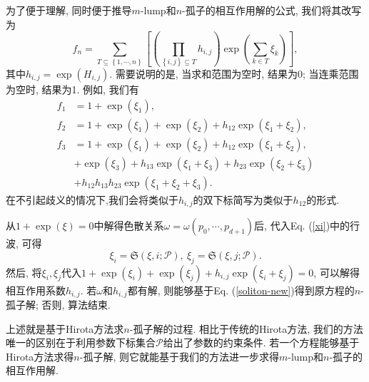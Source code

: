 \documentclass[12pt,a4paper,UTF8]{article}
\numberwithin{equation}{section}
\newcommand{\sbrace}[1]{\left(#1\right)}
\newcommand{\mbrace}[1]{\left[#1\right]}
\newcommand{\bbrace}[1]{\left\{#1\right\}}
\newcommand{\PS}{\mathcal{P}}
\newcommand{\SP}{\mathfrak{S}} %
\newcommand{\refeqn}[1]{Eq. (\ref{#1})}
\newcommand{\MLNS}{$m$-lump和$n$-孤子的相互作用解}
\begin{document}
为了便于理解, 同时便于推导\MLNS{}的公式, 我们将其改写为
\begin{equation}
f_n=\sum_{T\subseteq \bbrace{1,\cdots,n}}\mbrace{\sbrace{\prod_{\bbrace{i,j}\subseteq T}{h_{i,j}}}\exp\sbrace{\sum_{k\in T}{\xi_k}}}, 
\label{soliton-new}
\end{equation}
其中$h_{i,j}=\exp(H_{i,j})$. 需要说明的是, 当求和范围为空时, 结果为0; 当连乘范围为空时, 结果为1. 例如, 我们有
\begin{equation}
\begin{aligned}
f_1&=1+\exp(\xi_1) , \\ 
f_2&=1+\exp(\xi_1)+\exp(\xi_2)+h_{12}\exp(\xi_1+\xi_2) ,\\ 
f_3&=1+\exp(\xi_1)+\exp(\xi_2)+h_{12}\exp(\xi_1+\xi_2) ,\\ 
   &+\exp(\xi_3)+h_{13}\exp(\xi_1+\xi_3)+h_{23}\exp(\xi_2+\xi_3) \\
   &+h_{12}h_{13}h_{23}\exp(\xi_1+\xi_2+\xi_3) .
\end{aligned}
\end{equation}
在不引起歧义的情况下,我们会将类似于$h_{i,j}$的双下标简写为类似于$h_{12}$的形式. 

从$1+\exp(\xi)=0$中解得色散关系$\omega=\omega(p_0,\cdots,p_{d+1})$后, 代入\refeqn{xi}中的行波, 可得
\begin{equation}
  \xi_i=\SP\sbrace{\xi,i;\PS} , ~ \xi_j=\SP\sbrace{\xi,j;\PS} .
\end{equation}
然后, 将$\xi_i,\xi_j$代入$1+\exp(\xi_i)+\exp(\xi_j)+h_{i,j}\exp(\xi_i+\xi_j)=0$, 可以解得相互作用系数$h_{i,j}$. 若$\omega$和$h_{i,j}$都有解, 则能够基于\refeqn{soliton-new}得到原方程的$n$-孤子解; 否则, 算法结束. 

上述就是基于Hirota方法求$n$-孤子解的过程. 相比于传统的Hirota方法, 我们的方法唯一的区别在于利用参数下标集合$\PS$给出了参数的约束条件. 若一个方程能够基于Hirota方法求得$n$-孤子解, 则它就能基于我们的方法进一步求得\MLNS{}. 
\end{document}
